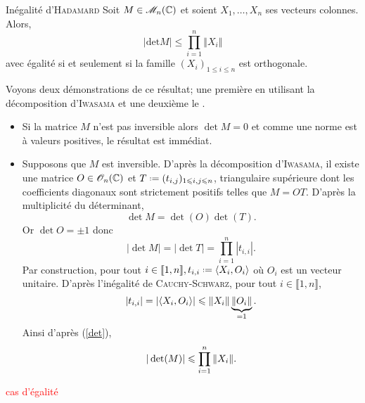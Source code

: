 
\begin{theo}{Inégalité d'\textsc{Hadamard}}
    Soit $M \in \mathscr{M}_n(\mathbb{C})$ et soient $X_1, \dots, X_n$ ses vecteurs colonnes. Alors,
    $$|\mathrm{det} M | \leqslant \prod_{i=1}^{n} \Vert X_i \Vert$$
    avec égalité si et seulement si la famille $(X_i)_{1 \leqslant i \leqslant n}$ est orthogonale.
\end{theo}

%    

Voyons deux démonstrations de ce résultat; une première en utilisant la décomposition d'\textsc{Iwasama} et une deuxième le .

\begin{preuve}
    \begin{itemize}
        \item Si la matrice $M$ n'est pas inversible alors $\det M = 0$ et comme une norme est à valeurs positives, le résultat est immédiat. 
        \item Supposons que $M$ est inversible. D'après la décomposition d'\textsc{Iwasama}, il existe une matrice $O \in \mathscr{O}_n(\mathbb{C})$ et $T \defeq (t_{i,j})_{1 \leqslant i, j \leqslant n}$, triangulaire supérieure dont les coefficients diagonaux sont strictement positifs telles que $M = OT$. D'après la multiplicité du déterminant, 
        $$\det M = \det(O) \det(T).$$
        Or $\det O = \pm 1$ donc
        \begin{equation} \label{det}
            |\det M | = |\det T | = \prod_{i=1}^{n} |t_{i,i}|.
        \end{equation}
        Par construction, pour tout $i \in \llbracket 1, n \rrbracket, t_{i,i} \defeq \langle X_i, O_i \rangle$ où $O_i$ est un vecteur unitaire. D'après l'inégalité de \textsc{Cauchy}-\textsc{Schwarz}, pour tout $i \in \llbracket 1, n \rrbracket$, 
        $$|t_{i,i}| = |\langle X_i, O_i \rangle | \leqslant \Vert X_i \Vert \underbrace{\Vert O_i \Vert}_{=1}.$$
        Ainsi d'après (\ref{det}), 
        $$|\det(M)| \leqslant \prod_{i=1}^n \Vert X_i \Vert.$$
    \end{itemize}
        \textcolor{red}{cas d'égalité}
\end{preuve}

